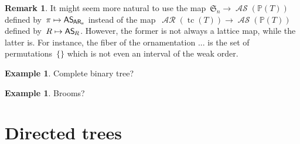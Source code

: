 \documentclass{amsart}
\theoremstyle{definition}
\newtheorem{example}[theorem]{Example}
\newtheorem{remark}[theorem]{Remark}
\renewcommand{\c}[1]{\mathcal{#1}} %
\DeclareMathOperator{\tc}{tc} %
\newcommand{\vincent}[1]{\todo[size=\tiny,color=blue!30]{ #1 \\ \hfill --- V.}\,}
\newcommand{\fS}{\mathfrak{S}} %
\newcommand{\mymap}[2]{\mathsf{#1}_{\hspace{-.7pt}#2}}
\DeclareMathOperator{\AReori}{\c{AR}}  %
\newcommand{\areori}[1]{\mymap{AR}{#1}}  %
\DeclareMathOperator{\ASour}{\mathcal{AS}}  %
\newcommand{\asour}[1]{\mymap{AS}{#1}}  %
\newcommand{\PP}{\mathbb P} %
\begin{document}
\begin{remark}
It might seem more natural to use the map~$\fS_n \to \ASour(\PP(T))$ defined by~$\pi \mapsto \asour{\areori{\pi}}$ instead of the map~$\AReori(\tc(T)) \to \ASour(\PP(T))$ defined by~$R \mapsto \asour{R}$.
However, the former is not always a lattice map, while the latter is.
For instance, the fiber of the ornamentation
...
is the set of permutations~$\{\}$ which is not even an interval of the weak order.
\vincent{todo}
\end{remark}

\begin{example}
Complete binary tree?
\end{example}

\begin{example}
Brooms?


\end{example}



\section{Directed trees}
\label{sec:directedTrees}
\end{document}
